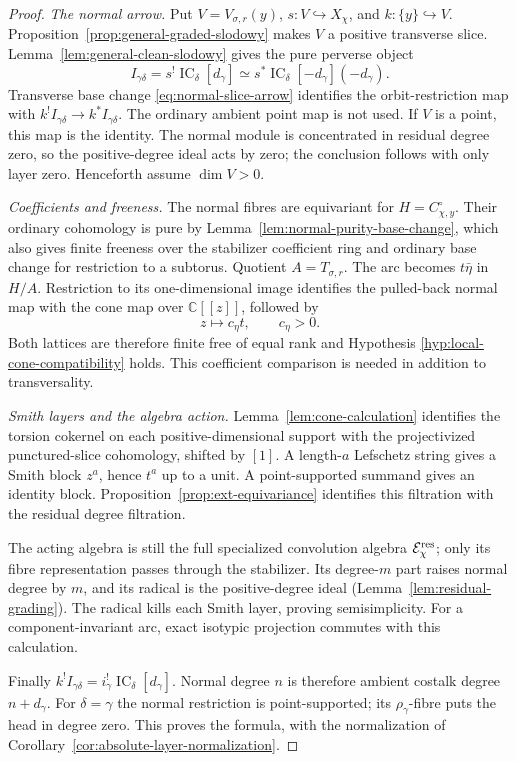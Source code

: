 \documentclass[11pt]{amsart}
\theoremstyle{definition}
\theoremstyle{remark}
\newcommand{\IC}{\operatorname{IC}}
\begin{document}
\begin{proof}
\emph{The normal arrow.}
Put $V=V_{\sigma,r}(y)$, $s:V\hookrightarrow X_\chi$, and
$k:\{y\}\hookrightarrow V$.  Proposition~\ref{prop:general-graded-slodowy}
makes $V$ a positive transverse slice.
Lemma~\ref{lem:general-clean-slodowy} gives the pure perverse object
\[
 I_{\gamma\delta}=s^!\IC_\delta[d_\gamma]
 \simeq s^*\IC_\delta[-d_\gamma](-d_\gamma).
\]
Transverse base change \eqref{eq:normal-slice-arrow} identifies the
orbit-restriction map with $k^!I_{\gamma\delta}\to k^*I_{\gamma\delta}$.
The ordinary ambient point map is not used.
If $V$ is a point, this map is the identity.  The normal module is
concentrated in residual degree zero, so the positive-degree ideal acts
by zero; the conclusion follows with only layer zero.  Henceforth
assume $\dim V>0$.

\smallskip
\emph{Coefficients and freeness.}
The normal fibres are equivariant for $H=C_{\chi,y}^\circ$.
Their ordinary cohomology is pure by
Lemma~\ref{lem:normal-purity-base-change}, which also gives finite
freeness over the stabilizer coefficient ring and ordinary base change
for restriction to a subtorus.  Quotient $A=T_{\sigma,r}$.
The arc becomes $t\bar\eta$ in $H/A$.  Restriction to its one-dimensional
image identifies the pulled-back normal map with the cone map over
$\mathbb C[[z]]$, followed by
\[
 z\longmapsto c_\eta t,\qquad c_\eta>0.
\]
Both lattices are therefore finite free of equal rank and Hypothesis
\ref{hyp:local-cone-compatibility} holds.  This coefficient comparison
is needed in addition to transversality.

\smallskip
\emph{Smith layers and the algebra action.}
Lemma~\ref{lem:cone-calculation} identifies the torsion cokernel on each
positive-dimensional support with the projectivized punctured-slice
cohomology, shifted by $[1]$.  A length-$a$ Lefschetz string gives a
Smith block $z^a$, hence $t^a$ up to a unit.  A point-supported summand
gives an identity block.  Proposition~\ref{prop:ext-equivariance}
identifies this filtration with the residual degree filtration.

The acting algebra is still the full specialized convolution algebra
$\mathcal E_\chi^{\rm res}$; only its fibre representation passes
through the stabilizer.  Its degree-$m$ part raises normal degree by
$m$, and its radical is the positive-degree ideal
(Lemma~\ref{lem:residual-grading}).  The radical kills each Smith
layer, proving semisimplicity.  For a component-invariant arc, exact
isotypic projection commutes with this calculation.

Finally $k^!I_{\gamma\delta}=i_\gamma^!\IC_\delta[d_\gamma]$.
Normal degree $n$ is therefore ambient costalk degree $n+d_\gamma$.
For $\delta=\gamma$ the normal restriction is point-supported; its
$\rho_\gamma$-fibre puts the head in degree zero.  This proves the
formula, with the normalization of
Corollary~\ref{cor:absolute-layer-normalization}.
\end{proof}
\end{document}
